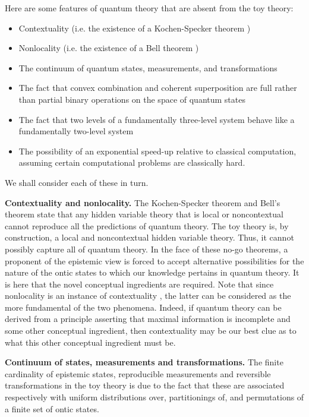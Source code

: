 \documentclass[pra,twocolumn,nofootinbib,showpacs]{revtex4}
\begin{document}
Here are some features of quantum theory that are absent from the toy theory:

\begin{itemize}
\item Contextuality (i.e. the existence of a Kochen-Specker theorem \cite%
{Bell,KochenSpecker})

\item Nonlocality (i.e. the existence of a Bell theorem \cite{Bell2})

\item The continuum of quantum states, measurements, and transformations

\item The fact that convex combination and coherent superposition are full
rather than partial binary operations on the space of quantum states

\item The fact that two levels of a fundamentally three-level system behave
like a fundamentally two-level system

\item The possibility of an exponential speed-up relative to classical
computation, assuming certain computational problems are classically hard.
\end{itemize}

We shall consider each of these in turn.

\textbf{Contextuality and nonlocality. }The Kochen-Specker theorem \cite%
{Bell,KochenSpecker} and Bell's theorem \cite{Bell2} state that any hidden
variable theory that is local or noncontextual cannot reproduce all the
predictions of quantum theory. The toy theory is, by construction, a local
and noncontextual hidden variable theory. Thus, it cannot possibly capture
all of quantum theory. In the face of these no-go theorems, a proponent of
the epistemic view is forced to accept alternative possibilities for the
nature of the ontic states to which our knowledge pertains in quantum
theory. It is here that the novel conceptual ingredients are required. Note
that since nonlocality is an instance of contextuality \cite{Mermin}, the
latter can be considered as the more fundamental of the two phenomena.
Indeed, if quantum theory can be derived from a principle asserting that
maximal information is incomplete and some other conceptual ingredient, then
contextuality may be our best clue as to what this other conceptual
ingredient must be.

\textbf{Continuum of states, measurements and transformations. }
The finite cardinality of epistemic states, reproducible
measurements and reversible transformations in the toy theory is
due to the fact that these are associated respectively with
uniform distributions over, partitionings of, and permutations of
a finite set of ontic states.
\end{document}
